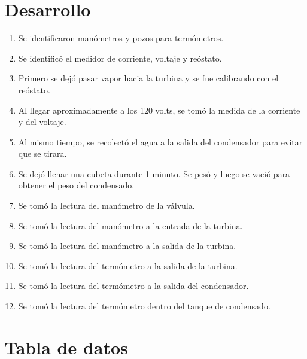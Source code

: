 \documentclass[12pt,letterpaper]{article}
\begin{document}
\section{Desarrollo}

\begin{enumerate}
    \item Se identificaron manómetros y pozos para termómetros.
    \item Se identificó el medidor de corriente, voltaje y reóstato.
    \item Primero se dejó pasar vapor hacia la turbina y se fue calibrando con el reóstato.
    \item Al llegar aproximadamente a los 120 volts, se tomó la medida de la corriente y del voltaje.
    \item Al mismo tiempo, se recolectó el agua a la salida del condensador para evitar que se tirara.
    \item Se dejó llenar una cubeta durante 1 minuto. Se pesó y luego se vació para 
    obtener el peso del condensado. 


    \item Se tomó la lectura del manómetro de la válvula.
    \item Se tomó la lectura del manómetro a la entrada de la turbina.
    \item Se tomó la lectura del manómetro a la salida de la turbina.


    \item Se tomó la lectura del termómetro a la salida de la turbina.
    \item Se tomó la lectura del termómetro a la salida del condensador.
    \item Se tomó la lectura del termómetro dentro del tanque de condensado.

\end{enumerate}

\section{Tabla de datos}
\end{document}
